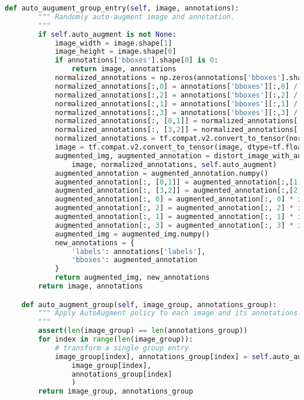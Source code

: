 \begin{lstlisting}[caption={Funzioni per applicare AutoAugment}, language=Python, basicstyle=\tiny,label=code:aaaugment_retinanet]
    def auto_augument_group_entry(self, image, annotations):
        """ Randomly auto-augment image and annotation.
        """
        if self.auto_augment is not None:
            image_width = image.shape[1]
            image_height = image.shape[0]
            if annotations['bboxes'].shape[0] is 0:
                return image, annotations
            normalized_annotations = np.zeros(annotations['bboxes'].shape)
            normalized_annotations[:,0] = annotations['bboxes'][:,0] / image_width
            normalized_annotations[:,2] = annotations['bboxes'][:,2] / image_width
            normalized_annotations[:,1] = annotations['bboxes'][:,1] / image_height
            normalized_annotations[:,3] = annotations['bboxes'][:,3] / image_height
            normalized_annotations[:, [0,1]] = normalized_annotations[:,[1,0]]
            normalized_annotations[:, [3,2]] = normalized_annotations[:,[2,3]]
            normalized_annotations = tf.compat.v2.convert_to_tensor(normalized_annotations, dtype=tf.float32)
            image = tf.compat.v2.convert_to_tensor(image, dtype=tf.float32)
            augmented_img, augmented_annotation = distort_image_with_autoaugment(
                image, normalized_annotations, self.auto_augment)
            augmented_annotation = augmented_annotation.numpy()
            augmented_annotation[:, [0,1]] = augmented_annotation[:,[1,0]]
            augmented_annotation[:, [3,2]] = augmented_annotation[:,[2,3]]
            augmented_annotation[:, 0] = augmented_annotation[:, 0] * image_width
            augmented_annotation[:, 2] = augmented_annotation[:, 2] * image_width
            augmented_annotation[:, 1] = augmented_annotation[:, 1] * image_height
            augmented_annotation[:, 3] = augmented_annotation[:, 3] * image_height
            augmented_img = augmented_img.numpy()
            new_annotations = {
                'labels': annotations['labels'],
                'bboxes': augmented_annotation
            }
            return augmented_img, new_annotations
        return image, annotations

    def auto_augment_group(self, image_group, annotations_group):
        """ Apply AutoAugment policy to each image and its annotations.
        """       
        assert(len(image_group) == len(annotations_group))
        for index in range(len(image_group)):
            # transform a single group entry
            image_group[index], annotations_group[index] = self.auto_augument_group_entry(
                image_group[index], 
                annotations_group[index]
                )
        return image_group, annotations_group
\end{lstlisting}

